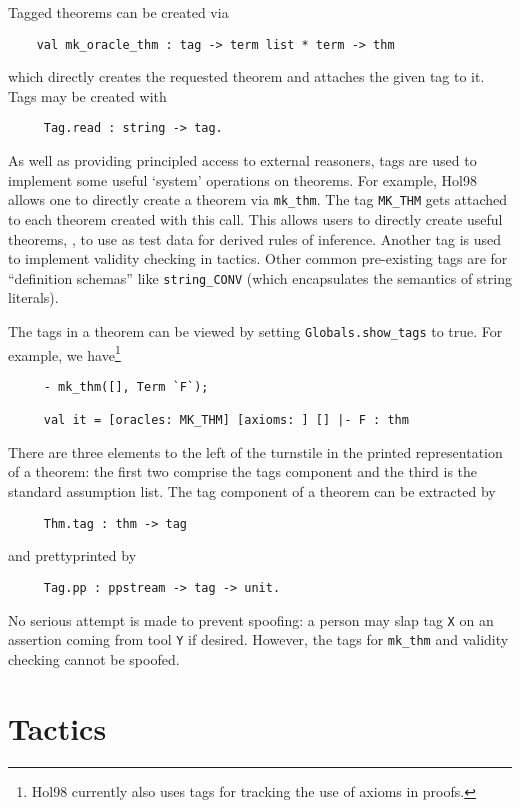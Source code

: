 \documentclass[12pt,fleqn,a4paper]{report}
\begin{document}
Tagged theorems can be created via
\begin{verbatim}
    val mk_oracle_thm : tag -> term list * term -> thm
\end{verbatim}
which directly creates the requested theorem and attaches the given tag to
it. Tags may be created with
\begin{verbatim}
     Tag.read : string -> tag.
\end{verbatim}
As well as providing principled access to external reasoners, tags are
used to implement some useful `system' operations on theorems. For
example, Hol98 allows one to directly create a theorem via
\verb+mk_thm+. The tag \verb+MK_THM+ gets attached to each theorem
created with this call. This allows users to directly create useful
theorems, \eg, to use as test data for derived rules of inference.
Another tag is used to implement validity checking in tactics. Other
common pre-existing tags are for ``definition schemas'' like
\verb+string_CONV+ (which encapsulates the semantics of string
literals).

The tags in a theorem can be viewed by setting \verb+Globals.show_tags+ to
true. For example, we have\footnote{Hol98 currently also uses tags for
tracking the use of axioms in proofs.}
\begin{verbatim}
     - mk_thm([], Term `F`);

     val it = [oracles: MK_THM] [axioms: ] [] |- F : thm
\end{verbatim}
There are three elements to the left of the turnstile in the printed
representation of a theorem: the first two comprise the tags component and the
third is the standard assumption list. The tag component of a theorem
can be extracted by
 \begin{verbatim}
     Thm.tag : thm -> tag
 \end{verbatim}
\noindent and prettyprinted by
 \begin{verbatim}
     Tag.pp : ppstream -> tag -> unit.
 \end{verbatim}


 No serious attempt is made to prevent spoofing: a person may slap tag
\verb+X+ on an assertion coming from tool \verb+Y+ if desired. However, the
tags for \verb+mk_thm+ and validity checking cannot be spoofed.

\section{Tactics}
\end{document}
